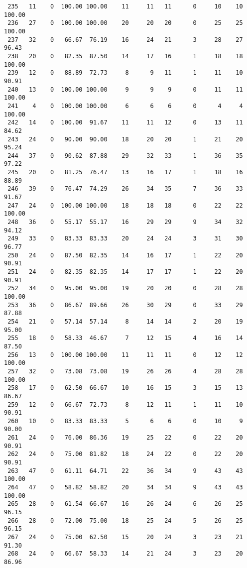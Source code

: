\begin{verbatim}
 235   11    0  100.00 100.00    11     11   11      0     10    10   100.00
 236   27    0  100.00 100.00    20     20   20      0     25    25   100.00
 237   32    0   66.67  76.19    16     24   21      3     28    27    96.43
 238   20    0   82.35  87.50    14     17   16      1     18    18   100.00
 239   12    0   88.89  72.73     8      9   11      1     11    10    90.91
 240   13    0  100.00 100.00     9      9    9      0     11    11   100.00
 241    4    0  100.00 100.00     6      6    6      0      4     4   100.00
 242   14    0  100.00  91.67    11     11   12      0     13    11    84.62
 243   24    0   90.00  90.00    18     20   20      1     21    20    95.24
 244   37    0   90.62  87.88    29     32   33      1     36    35    97.22
 245   20    0   81.25  76.47    13     16   17      1     18    16    88.89
 246   39    0   76.47  74.29    26     34   35      7     36    33    91.67
 247   24    0  100.00 100.00    18     18   18      0     22    22   100.00
 248   36    0   55.17  55.17    16     29   29      9     34    32    94.12
 249   33    0   83.33  83.33    20     24   24      3     31    30    96.77
 250   24    0   87.50  82.35    14     16   17      1     22    20    90.91
 251   24    0   82.35  82.35    14     17   17      1     22    20    90.91
 252   34    0   95.00  95.00    19     20   20      0     28    28   100.00
 253   36    0   86.67  89.66    26     30   29      0     33    29    87.88
 254   21    0   57.14  57.14     8     14   14      2     20    19    95.00
 255   18    0   58.33  46.67     7     12   15      4     16    14    87.50
 256   13    0  100.00 100.00    11     11   11      0     12    12   100.00
 257   32    0   73.08  73.08    19     26   26      4     28    28   100.00
 258   17    0   62.50  66.67    10     16   15      3     15    13    86.67
 259   12    0   66.67  72.73     8     12   11      1     11    10    90.91
 260   10    0   83.33  83.33     5      6    6      0     10     9    90.00
 261   24    0   76.00  86.36    19     25   22      0     22    20    90.91
 262   24    0   75.00  81.82    18     24   22      0     22    20    90.91
 263   47    0   61.11  64.71    22     36   34      9     43    43   100.00
 264   47    0   58.82  58.82    20     34   34      9     43    43   100.00
 265   28    0   61.54  66.67    16     26   24      6     26    25    96.15
 266   28    0   72.00  75.00    18     25   24      5     26    25    96.15
 267   24    0   75.00  62.50    15     20   24      3     23    21    91.30
 268   24    0   66.67  58.33    14     21   24      3     23    20    86.96

\end{verbatim}

